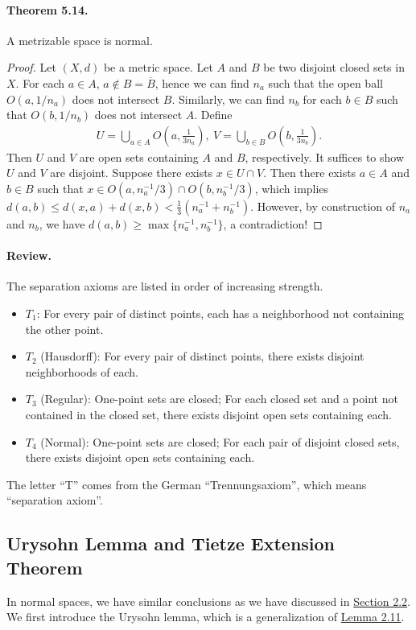 \documentclass{article}
\numberwithin{equation}{section}
\theoremstyle{plain}
\theoremstyle{definition}
\begin{document}
\paragraph{Theorem 5.14.\label{thm:5.14}} A metrizable space is normal.
\begin{proof}
Let $(X,d)$ be a metric space. Let $A$ and $B$ be two disjoint closed sets in $X$. For each $a\in A$, $a\notin B=\overline{B}$, hence we can find $n_a$ such that the open ball $O(a,1/n_a)$ does not intersect $B$. Similarly, we can find $n_b$ for each $b\in B$ such that $O(b,1/n_b)$ does not intersect $A$. Define 
\begin{align*}
	U=\bigcup_{a\in A}O\left(a,\frac{1}{3n_a}\right),\ V=\bigcup_{b\in B}O\left(b,\frac{1}{3n_b}\right).
\end{align*}
Then $U$ and $V$ are open sets containing $A$ and $B$, respectively. It suffices to show $U$ and $V$ are disjoint. Suppose there exists $x\in U\cap V$. Then there exists $a\in A$ and $b\in B$ such that $x\in O(a,n_a^{-1}/3)\cap O(b,n_b^{-1}/3)$, which implies $d(a,b)\leq d(x,a) + d(x,b) < \frac{1}{3}(n_a^{-1}+n_b^{-1})$. However, by construction of $n_a$ and $n_b$, we have $d(a,b)\geq \max\{n_a^{-1},n_b^{-1}\}$, a contradiction!
\end{proof}

\paragraph{Review.} The separation axioms are listed in order of increasing strength.
\begin{itemize}
	\item $T_1$: For every pair of distinct points, each has a neighborhood not containing the other point.
	\item $T_2$ (Hausdorff): For every pair of distinct points, there exists disjoint neighborhoods of each.
	\item $T_3$ (Regular): One-point sets are closed; For each closed set and a point not contained in the closed set, there exists disjoint open sets containing each.
	\item $T_4$ (Normal): One-point sets are closed; For each pair of disjoint closed sets, there exists disjoint open sets containing each.
\end{itemize}

The letter ``T'' comes from the German ``Trennungsaxiom'', which means ``separation axiom''.

\subsection{Urysohn Lemma and Tietze Extension Theorem}
In normal spaces, we have similar conclusions as we have discussed in \hyperref[subsec:2.2]{Section 2.2}. We first introduce the Urysohn lemma, which is a generalization of \hyperref[lemma:2.11]{Lemma 2.11}.
\end{document}
